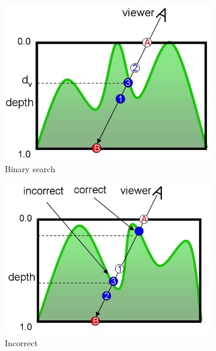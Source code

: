 \begin{figure}
\begin{fullwidth}	
	\begin{subfigure}[t]{0.33\thewidth}
		\includegraphics[width=\textwidth]{graphics/df/relief-mapping1}
		\caption{Binary search}
	\end{subfigure}
	\begin{subfigure}[t]{.33\thewidth}
		\includegraphics[width=\textwidth]{graphics/df/relief-mapping2}
		\caption{Incorrect}
	\end{subfigure}
	\begin{subfigure}[t]{.33\thewidth}

\end{subfigure}
\end{fullwidth}
\end{figure}
